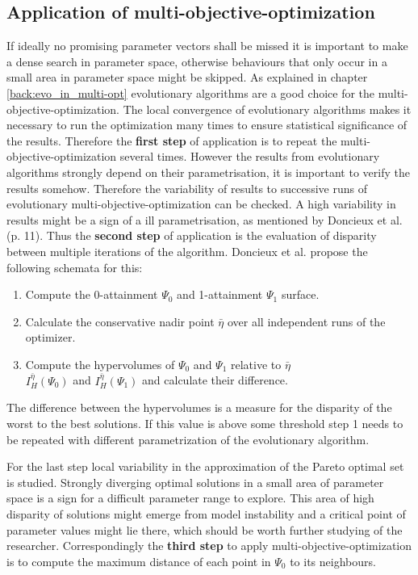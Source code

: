 \documentclass[12pt,twoside]{article}
\theoremstyle{plain}
\theoremstyle{definition}
\theoremstyle{remark}
\begin{document}
\subsection{Application of multi-objective-optimization}
If ideally no promising parameter vectors shall be missed it is important to make a dense search in parameter space, otherwise behaviours that only occur in a small area in parameter space might be skipped.
As explained in chapter \ref{back:evo_in_multi-opt} evolutionary algorithms are a good choice for the multi-objective-optimization.
The local convergence of evolutionary algorithms makes it necessary to run the optimization many times to ensure statistical significance of the results. Therefore the \textbf{first step} of application is to repeat the multi-objective-optimization several times.
However the results from evolutionary algorithms strongly depend on their parametrisation, it is important to verify the results somehow.
Therefore the variability of results to successive runs of evolutionary multi-objective-optimization can be checked.
A high variability in results might be a sign of a ill parametrisation, as mentioned by Doncieux et al. \cite{doncieux2015multi} (p. 11).
Thus the \textbf{second step} of application is the evaluation of disparity between multiple iterations of the algorithm. Doncieux et al. propose the following schemata for this:
\begin{enumerate}
	\item Compute the 0-attainment $\Psi_0$ and 1-attainment $\Psi_1$ surface.
	\item Calculate the conservative nadir point $\bar{\eta}$ over all independent runs of the optimizer.
	\item Compute the hypervolumes of $\Psi_0$ and $\Psi_1$ relative to $\bar{\eta}$\\ $I^{\bar{\eta}}_H(\Psi_0)$ and $I^{\bar{\eta}}_H(\Psi_1)$ and calculate their difference.
\end{enumerate}
The difference between the hypervolumes is a measure for the disparity of the worst to the best solutions. If this value is above some threshold step 1 needs to be repeated with different parametrization of the evolutionary algorithm.

For the last step local variability in the approximation of the Pareto optimal set is studied. Strongly diverging optimal solutions in a small area of parameter space is a sign for a difficult parameter range to explore.
This area of high disparity of solutions might emerge from model instability and a critical point of parameter values might lie there, which should be worth further studying of the researcher.
Correspondingly the \textbf{third step} to apply multi-objective-optimization is to compute the maximum distance of each point in $\Psi_0$ to its neighbours.
\end{document}
